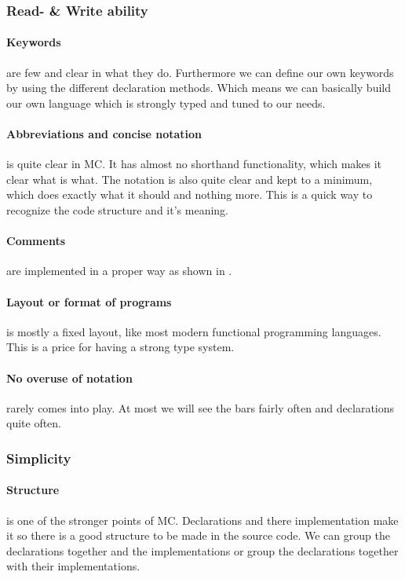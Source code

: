 \begin{multicols}{2}

   \subsubsection{Read- \& Write ability}\label{sec:readwrite}
   \paragraph{Keywords}
   are few and clear in what they do.
   Furthermore we can define our own keywords by using the different declaration methods.\cite{sectionstuff}
   Which means we can basically build our own language which is strongly typed and tuned to our needs.

   \paragraph{Abbreviations and concise notation}
   is quite clear in MC.
   It has almost no shorthand functionality, which makes it clear what is what.
   The notation is also quite clear and kept to a minimum, which does exactly what it should and nothing more.
   This is a quick way to recognize the code structure and it's meaning.

   \paragraph{Comments}
   are implemented in a proper way as shown in \cite{sectionstuff}.

   \paragraph{Layout or format of programs}
   is mostly a fixed layout, like most modern functional programming languages.
   This is a price for having a strong type system.

   \paragraph{No overuse of notation}
   rarely comes into play.
   At most we will see the bars fairly often and declarations quite often.

   \subsubsection{Simplicity}\label{sec:simplicity}
   \paragraph{Structure}
   is one of the stronger points of MC.
   Declarations and there implementation make it so there is a good structure to be made in the source code.
   We can group the declarations together and the implementations or group the declarations together with their implementations.


\end{multicols}
